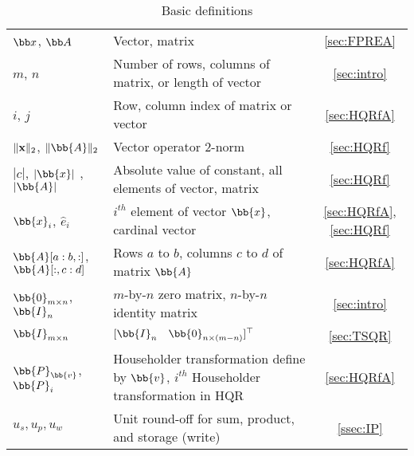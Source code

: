 \begin{table}[h!]
\begin{tabular}{|m{3cm}|m{9cm}|c|}
		\hline
		${\bb x}$, ${\bb A}$  & Vector, matrix  & \ref{sec:FPREA} \\
		$m$, $n$ & Number of rows, columns of matrix, or length of vector&  \ref{sec:intro}\\
		$i$, $j$ & Row, column index of matrix or vector & \ref{sec:HQRfA} \\
		$\|{\bf x}\|_2$, $\|\bb{A}\|_2$ & Vector operator 2-norm & \ref{sec:HQRf}\\
		$|c|$, $|\bb{x}|$ ,$|\bb{A}|$ & Absolute value of constant, all elements of vector, matrix & \ref{sec:HQRf} \\
		$\bb{x}_i$, $\hat{e}_i$  & $i^{th}$ element of vector $\bb{x}$, cardinal vector &  \ref{sec:HQRfA}, \ref{sec:HQRf}\\
		$\bb{A}[a:b,:]$, $\bb{A}[:,c:d]$ & Rows $a$ to $b$, columns $c$ to $d$ of matrix $\bb{A}$& \ref{sec:HQRfA}\\
		$\bb{0}_{m\times n}$, $\bb{I}_{n}$ & $m$-by-$n$ zero matrix, $n$-by-$n$ identity  matrix &  \ref{sec:intro}\\
		$\bb{I}_{m\times n}$ & $[\bb{I}_{n} \quad \bb{0}_{n \times (m-n)}]^{\top}$ & \ref{sec:TSQR}\\ \hline
		$\bb{P}_{\bb{v}}$, $\bb{P}_i$ & Householder transformation define by $\bb{v}$, $i^{th}$ Householder transformation in HQR& \ref{sec:HQRfA}\\
		\hline		
		$u_s, u_p, u_w$ & Unit round-off for sum, product, and storage (write) & \ref{ssec:IP}\\ 
		\hline
	\end{tabular}
	\caption{Basic definitions}
	\label{table:notation}
\end{table}